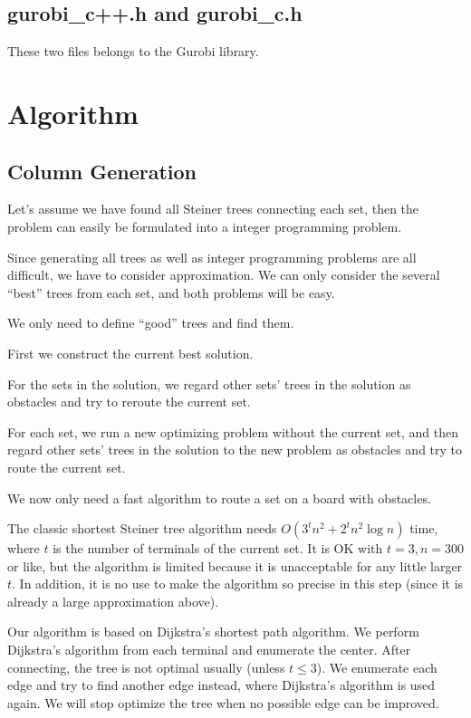 \documentclass[12pt, a4paper]{article}
\begin{document}
		\subsection{gurobi\_c++.h and gurobi\_c.h}
		
			These two files belongs to the Gurobi library.

	\section{Algorithm}
	
	\subsection{Column Generation}
	
	Let's assume we have found all Steiner trees connecting each set, then the problem can easily be formulated into a integer programming problem.
	
	Since generating all trees as well as integer programming problems are all difficult, we have to consider approximation. We can only consider the several ``best'' trees from each set, and both problems will be easy.
	
	We only need to define ``good'' trees and find them.
	
	First we construct the current best solution.
	
	For the sets in the solution, we regard other sets' trees in the solution as obstacles and try to reroute the current set.
	
	For each set, we run a new optimizing problem without the current set, and then regard other sets' trees in the solution to the new problem as obstacles and try to route the current set.
	
	We now only need a fast algorithm to route a set on a board with obstacles.
	
	The classic shortest Steiner tree algorithm needs $O(3^t n^2 + 2^t n^2 \log n)$ time, where $t$ is the number of terminals of the current set. It is OK with $t = 3, n = 300$ or like, but the algorithm is limited because it is unacceptable for any little larger $t$. In addition, it is no use to make the algorithm so precise in this step (since it is already a large approximation above).
	
	Our algorithm is based on Dijkstra's shortest path algorithm. We perform Dijkstra's algorithm from each terminal and enumerate the center. After connecting, the tree is not optimal usually (unless $t \leq 3$). We enumerate each edge and try to find another edge instead, where Dijkstra's algorithm is used again. We will stop optimize the tree when no possible edge can be improved.
	
\end{document}
